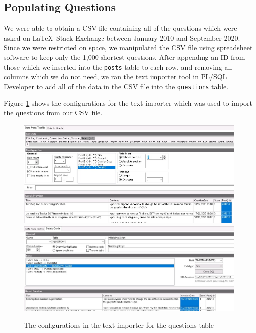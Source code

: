 
\subsection{Populating Questions}

We were able to obtain a CSV file containing all of the questions which were asked on \LaTeX\ Stack Exchange between January 2010 and September 2020. Since we were restricted on space, we manipulated the CSV file using spreadsheet software to keep only the 1,000 shortest questions. After appending an ID from those which we inserted into the \verb`posts` table to each row, and removing all columns which we do not need, we ran the text importer tool in PL/SQL Developer to add all of the data in the CSV file into the \verb`questions` table.

Figure \ref{questions-text-import} shows the configurations for the text importer which was used to import the questions from our CSV file.

\begin{figure}[htbp]
	\centering
	\includegraphics[width=\linewidth]{images/questions_text_import_1.jpeg}
	\vspace{2em}
	\includegraphics[width=\linewidth]{images/questions_text_import_2.jpeg}
	\caption{The configurations in the text importer for the questions table}
	\label{questions-text-import}
\end{figure}

